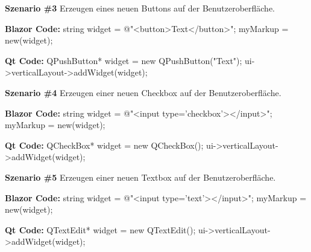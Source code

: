 \textbf{Szenario \#3}
\newline
Erzeugen eines neuen Buttons auf der Benutzeroberfläche.

\begin{zitat}
    \textbf{Blazor Code:}
    \newline
    string widget = @"<button>Text</button>";
    \newline
    myMarkup = new(widget);
\end{zitat}

\begin{zitat}
    \textbf{Qt Code:}
    \newline
    QPushButton* widget = new QPushButton("Text");
    \newline
    ui->verticalLayout->addWidget(widget);
\end{zitat}
\newline
\newline

\textbf{Szenario \#4}
\newline
Erzeugen einer neuen Checkbox auf der Benutzeroberfläche.

\begin{zitat}
    \textbf{Blazor Code:}
    \newline
    string widget = @"<input type='checkbox'></input>";
    \newline
    myMarkup = new(widget);
\end{zitat}

\begin{zitat}
    \textbf{Qt Code:}
    \newline
    QCheckBox* widget = new QCheckBox();
    \newline
    ui->verticalLayout->addWidget(widget);
\end{zitat}
\newline
\newline

\textbf{Szenario \#5}
\newline
Erzeugen einer neuen Textbox auf der Benutzeroberfläche.

\begin{zitat}
    \textbf{Blazor Code:}
    \newline
    string widget = @"<input type='text'></input>";
    \newline
    myMarkup = new(widget);
\end{zitat}

\begin{zitat}
    \textbf{Qt Code:}
    \newline
    QTextEdit* widget = new QTextEdit();
    \newline
    ui->verticalLayout->addWidget(widget);
\end{zitat}
\newline
\newline

